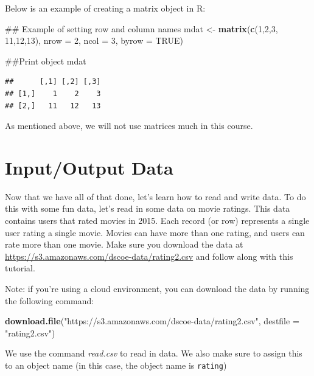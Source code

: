 \documentclass[]{book}
\newenvironment{Shaded}{\begin{snugshade}}{\end{snugshade}}
\newcommand{\KeywordTok}[1]{\textcolor[rgb]{0.13,0.29,0.53}{\textbf{{#1}}}}
\newcommand{\DataTypeTok}[1]{\textcolor[rgb]{0.13,0.29,0.53}{{#1}}}
\newcommand{\DecValTok}[1]{\textcolor[rgb]{0.00,0.00,0.81}{{#1}}}
\newcommand{\StringTok}[1]{\textcolor[rgb]{0.31,0.60,0.02}{{#1}}}
\newcommand{\OtherTok}[1]{\textcolor[rgb]{0.56,0.35,0.01}{{#1}}}
\newcommand{\NormalTok}[1]{{#1}}
\begin{document}
Below is an example of creating a matrix object in R:

\begin{Shaded}
\begin{Highlighting}[]
\NormalTok{## Example of setting row and column names}
\NormalTok{mdat <-}\StringTok{ }\KeywordTok{matrix}\NormalTok{(}\KeywordTok{c}\NormalTok{(}\DecValTok{1}\NormalTok{,}\DecValTok{2}\NormalTok{,}\DecValTok{3}\NormalTok{, }\DecValTok{11}\NormalTok{,}\DecValTok{12}\NormalTok{,}\DecValTok{13}\NormalTok{), }\DataTypeTok{nrow =} \DecValTok{2}\NormalTok{, }\DataTypeTok{ncol =} \DecValTok{3}\NormalTok{, }\DataTypeTok{byrow =} \OtherTok{TRUE}\NormalTok{)}

\NormalTok{##Print object}
\NormalTok{mdat}
\end{Highlighting}
\end{Shaded}

\begin{verbatim}
##      [,1] [,2] [,3]
## [1,]    1    2    3
## [2,]   11   12   13
\end{verbatim}

As mentioned above, we will not use matrices much in this course.

\section{Input/Output Data}\label{inputoutput-data}

Now that we have all of that done, let's learn how to read and write
data. To do this with some fun data, let's read in some data on movie
ratings. This data contains users that rated movies in 2015. Each record
(or row) represents a single user rating a single movie. Movies can have
more than one rating, and users can rate more than one movie. Make sure
you download the data at
\url{https://s3.amazonaws.com/dscoe-data/rating2.csv} and follow along
with this tutorial.

Note: if you're using a cloud environment, you can download the data by
running the following command:

\begin{Shaded}
\begin{Highlighting}[]
\KeywordTok{download.file}\NormalTok{(}\StringTok{"https://s3.amazonaws.com/dscoe-data/rating2.csv"}\NormalTok{, }\DataTypeTok{destfile =} \StringTok{"rating2.csv"}\NormalTok{)}
\end{Highlighting}
\end{Shaded}

We use the command \emph{read.csv} to read in data. We also make sure to
assign this to an object name (in this case, the object name is
\texttt{rating})
\end{document}
